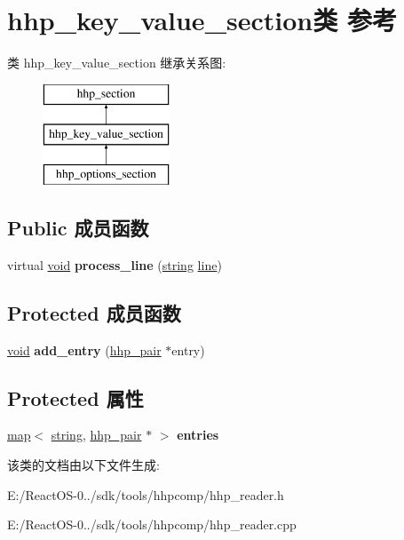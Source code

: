 \hypertarget{classhhp__key__value__section}{}\section{hhp\+\_\+key\+\_\+value\+\_\+section类 参考}
\label{classhhp__key__value__section}
类 hhp\+\_\+key\+\_\+value\+\_\+section 继承关系图\+:\begin{figure}[H]
\begin{center}
\leavevmode
\includegraphics[height=3.000000cm]{classhhp__key__value__section}
\end{center}
\end{figure}
\subsection*{Public 成员函数}
\begin{DoxyCompactItemize}
\item 
\mbox{\label{classhhp__key__value__section_a286fb3110f8bb0a57e7142040a316be7}} 
virtual \hyperlink{interfacevoid}{void} {\bfseries process\+\_\+line} (\hyperlink{structstring}{string} \hyperlink{structline}{line})
\end{DoxyCompactItemize}
\subsection*{Protected 成员函数}
\begin{DoxyCompactItemize}
\item 
\mbox{\label{classhhp__key__value__section_a30500def8e61eda40b70c15fd2981841}} 
\hyperlink{interfacevoid}{void} {\bfseries add\+\_\+entry} (\hyperlink{classhhp__pair}{hhp\+\_\+pair} $\ast$entry)
\end{DoxyCompactItemize}
\subsection*{Protected 属性}
\begin{DoxyCompactItemize}
\item 
\mbox{\label{classhhp__key__value__section_a3c56389bb192e41c7b4caa764082abba}} 
\hyperlink{classmap}{map}$<$ \hyperlink{structstring}{string}, \hyperlink{classhhp__pair}{hhp\+\_\+pair} $\ast$ $>$ {\bfseries entries}
\end{DoxyCompactItemize}


该类的文档由以下文件生成\+:\begin{DoxyCompactItemize}
\item 
E\+:/\+React\+O\+S-\/0../sdk/tools/hhpcomp/hhp\+\_\+reader.\+h\item 
E\+:/\+React\+O\+S-\/0../sdk/tools/hhpcomp/hhp\+\_\+reader.\+cpp\end{DoxyCompactItemize}
